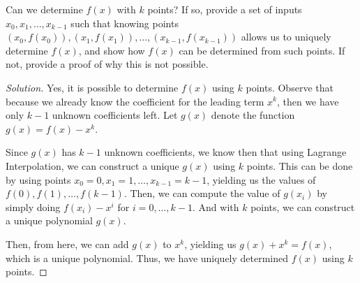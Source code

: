 \documentclass{article}
\newenvironment{solution}{\begin{proof}[Solution]}{\end{proof}}
\begin{document}
\begin{hw}
	Can we determine $f(x)$ with $k$ points? If so, provide a set of inputs $x_0, x_1, \dots, x_{k-1}$ such that knowing points $(x_0, f(x_0)), (x_1, f(x_1)), \dots, (x_{k-1}, f(x_{k-1}))$ allows us to uniquely determine $f(x)$, and show how $f(x)$ can be determined from such points. If not, provide a proof of why this is not possible.
\end{hw}
\begin{solution}
	Yes, it is possible to determine $f(x)$ using $k$ points. Observe that because we already know the coefficient for the leading term $x^{k}$, then we have only $k-1$ unknown coefficients left. Let $g(x)$ denote the function $g(x) = f(x) - x^{k}$. 
	
	Since $g(x)$ has $k-1$ unknown coefficients, we know then that using Lagrange Interpolation, we can construct a unique $g(x)$ using $k$ points. This can be done by using points $x_{0} = 0, x_{1} = 1, \ldots, x_{k-1} = k-1$, yielding us the values of $f(0), f(1), \ldots, f(k-1)$. Then, we can compute the value of $g(x_{i})$ by simply doing $f(x_{i}) - x^{i}$ for $i = 0, \ldots, k-1$. And with $k$ points, we can construct a unique polynomial $g(x)$.
	
	Then, from here, we can add $g(x)$ to $x^{k}$, yielding us $g(x) + x^{k} = f(x)$, which is a unique polynomial. Thus, we have uniquely determined $f(x)$ using $k$ points.
\end{solution}
\end{document}
